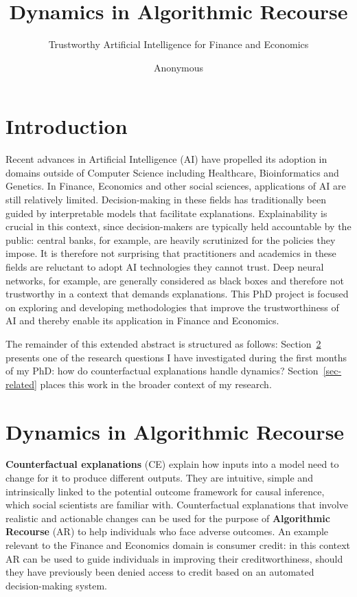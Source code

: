 \documentclass[
  sigconf]{acmart}
\author{Anonymous}
\affiliation{%
  \institution{Delft University of Technology}
  \city{Delft}
  \country{The Netherlands}
}
\title{Dynamics in Algorithmic Recourse}
\subtitle{Trustworthy Artificial Intelligence for Finance and Economics}
\author{}
\date{}
\begin{document}
\maketitle

\ifdefined\Shaded\renewenvironment{Shaded}{\begin{tcolorbox}[sharp corners, breakable, borderline west={3pt}{0pt}{shadecolor}, interior hidden, frame hidden, enhanced, boxrule=0pt]}{\end{tcolorbox}}\fi

\hypertarget{introduction}{%
\section{Introduction}\label{introduction}}

Recent advances in Artificial Intelligence (AI) have propelled its
adoption in domains outside of Computer Science including Healthcare,
Bioinformatics and Genetics. In Finance, Economics and other social
sciences, applications of AI are still relatively limited.
Decision-making in these fields has traditionally been guided by
interpretable models that facilitate explanations. Explainability is
crucial in this context, since decision-makers are typically held
accountable by the public: central banks, for example, are heavily
scrutinized for the policies they impose. It is therefore not surprising
that practitioners and academics in these fields are reluctant to adopt
AI technologies they cannot trust. Deep neural networks, for example,
are generally considered as black boxes and therefore not trustworthy in
a context that demands explanations. This PhD project is focused on
exploring and developing methodologies that improve the trustworthiness
of AI and thereby enable its application in Finance and Economics.

The remainder of this extended abstract is structured as follows:
Section~\ref{sec-main} presents one of the research questions I have
investigated during the first months of my PhD: how do counterfactual
explanations handle dynamics? Section~\ref{sec-related} places this work
in the broader context of my research.

\hypertarget{sec-main}{%
\section{Dynamics in Algorithmic Recourse}\label{sec-main}}

\textbf{Counterfactual explanations} (CE) explain how inputs into a
model need to change for it to produce different outputs. They are
intuitive, simple and intrinsically linked to the potential outcome
framework for causal inference, which social scientists are familiar
with. Counterfactual explanations that involve realistic and actionable
changes can be used for the purpose of \textbf{Algorithmic Recourse}
(AR) to help individuals who face adverse outcomes. An example relevant
to the Finance and Economics domain is consumer credit: in this context
AR can be used to guide individuals in improving their creditworthiness,
should they have previously been denied access to credit based on an
automated decision-making system.
\end{document}
